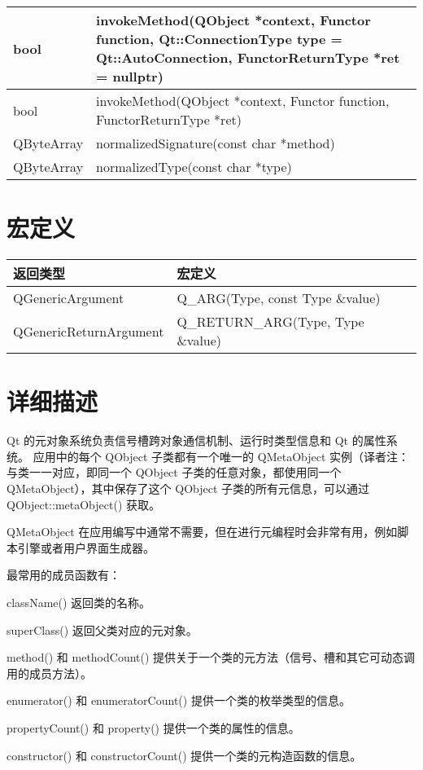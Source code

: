 \begin{longtable}{|l|m{28em}|}
\hline
bool	&invokeMethod(QObject *context, Functor function, Qt::ConnectionType type = Qt::AutoConnection, FunctorReturnType *ret = nullptr) \\
\hline
bool	&invokeMethod(QObject *context, Functor function, FunctorReturnType *ret) \\
\hline
QByteArray&	normalizedSignature(const char *method) \\
\hline
QByteArray&	normalizedType(const char *type)\\
\hline
\end{longtable}

\section{宏定义}

\begin{tabular}{|l|l|}
\hline
返回类型	& 宏定义 \\
\hline
QGenericArgument	& Q\_ARG(Type, const Type \&value) \\
\hline
QGenericReturnArgument&	Q\_RETURN\_ARG(Type, Type \&value) \\
\hline
\end{tabular}



\section{详细描述}

Qt 的元对象系统负责信号槽跨对象通信机制、运行时类型信息和 Qt 的属性系统。
应用中的每个 QObject 子类都有一个唯一的 QMetaObject 实例（译者注：与类一一对应，即同一个 QObject 子类的任意对象，都使用同一个 QMetaObject），其中保存了这个 QObject 子类的所有元信息，可以通过 QObject::metaObject() 获取。

QMetaObject 在应用编写中通常不需要，但在进行元编程时会非常有用，例如脚本引擎或者用户界面生成器。

最常用的成员函数有：

\begin{compactitem}
\item className() 返回类的名称。
\item superClass() 返回父类对应的元对象。
\item method() 和 methodCount() 提供关于一个类的元方法（信号、槽和其它可动态调用的成员方法）。
\item enumerator() 和 enumeratorCount() 提供一个类的枚举类型的信息。
\item propertyCount() 和 property() 提供一个类的属性的信息。
\item constructor() 和 constructorCount() 提供一个类的元构造函数的信息。
\end{compactitem}



